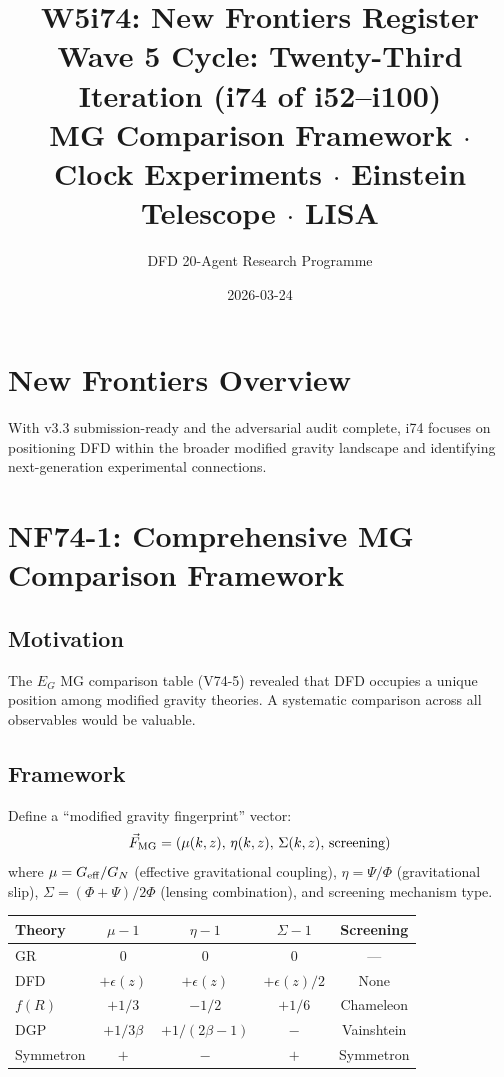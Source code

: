 \documentclass[11pt,a4paper]{article}
\title{\Large W5i74: New Frontiers Register\\[6pt]
\normalsize Wave 5 Cycle: Twenty-Third Iteration (i74 of i52--i100)\\[6pt]
MG Comparison Framework $\cdot$ Clock Experiments $\cdot$ Einstein Telescope $\cdot$ LISA}
\author{DFD 20-Agent Research Programme}
\date{2026-03-24}
\begin{document}
\maketitle

\section{New Frontiers Overview}

With v3.3 submission-ready and the adversarial audit complete, i74 focuses on positioning DFD within the broader modified gravity landscape and identifying next-generation experimental connections.

\section{NF74-1: Comprehensive MG Comparison Framework}

\subsection{Motivation}
The $E_G$ MG comparison table (V74-5) revealed that DFD occupies a unique position among modified gravity theories. A systematic comparison across all observables would be valuable.

\subsection{Framework}
Define a ``modified gravity fingerprint'' vector:
\[
\vec{F}_{\rm MG} = \left(\mu(k,z),\, \eta(k,z),\, \Sigma(k,z),\, \text{screening}\right)
\]
where $\mu = G_{\rm eff}/G_N$ (effective gravitational coupling), $\eta = \Psi/\Phi$ (gravitational slip), $\Sigma = (\Phi+\Psi)/2\Phi$ (lensing combination), and screening mechanism type.

\begin{center}
\begin{tabular}{lcccc}
\toprule
\textbf{Theory} & $\mu - 1$ & $\eta - 1$ & $\Sigma - 1$ & \textbf{Screening} \\
\midrule
GR & 0 & 0 & 0 & --- \\
DFD & $+\epsilon(z)$ & $+\epsilon(z)$ & $+\epsilon(z)/2$ & None \\
$f(R)$ & $+1/3$ & $-1/2$ & $+1/6$ & Chameleon \\
DGP & $+1/3\beta$ & $+1/(2\beta-1)$ & $-$ & Vainshtein \\
Symmetron & $+$ & $-$ & $+$ & Symmetron \\
\bottomrule
\end{tabular}
\end{center}
\end{document}
